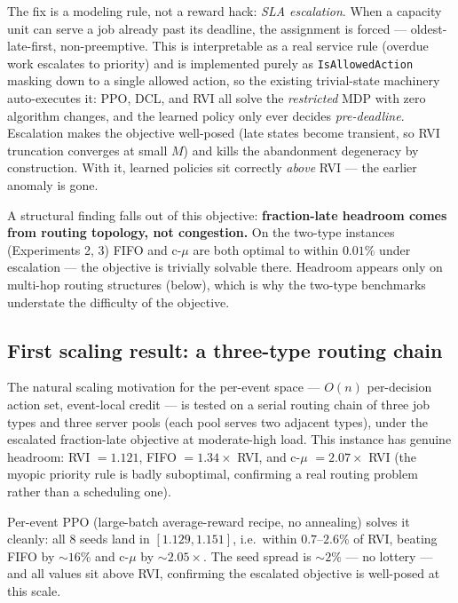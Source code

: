 \documentclass[11pt,a4paper]{article}
\begin{document}
The fix is a modeling rule, not a reward hack: \emph{SLA escalation}.
When a capacity unit can serve a job already past its deadline, the
assignment is forced --- oldest-late-first, non-preemptive.  This is
interpretable as a real service rule (overdue work escalates to priority)
and is implemented purely as \texttt{IsAllowedAction} masking down to a
single allowed action, so the existing trivial-state machinery
auto-executes it: PPO, DCL, and RVI all solve the \emph{restricted} MDP
with zero algorithm changes, and the learned policy only ever decides
\emph{pre-deadline}.  Escalation makes the objective well-posed (late
states become transient, so RVI truncation converges at small $M$) and
kills the abandonment degeneracy by construction.  With it, learned
policies sit correctly \emph{above} RVI --- the earlier anomaly is gone.

A structural finding falls out of this objective:
\textbf{fraction-late headroom comes from routing topology, not
congestion.}  On the two-type instances (Experiments 2, 3) FIFO and c-$\mu$
are both optimal to within $0.01\%$ under escalation --- the objective is
trivially solvable there.  Headroom appears only on multi-hop routing
structures (below), which is why the two-type benchmarks understate the
difficulty of the objective.

\subsection{First scaling result: a three-type routing chain}
\label{sec:pe-scaling}

The natural scaling motivation for the per-event space --- $O(n)$
per-decision action set, event-local credit --- is tested on a serial
routing chain of three job types and three server pools (each pool serves
two adjacent types), under the escalated fraction-late objective at
moderate-high load.  This instance has genuine headroom: RVI $=1.121$,
FIFO $=1.34\times$ RVI, and c-$\mu$ $=2.07\times$ RVI (the myopic priority
rule is badly suboptimal, confirming a real routing problem rather than a
scheduling one).

Per-event PPO (large-batch average-reward recipe, no annealing) solves it
cleanly: all 8 seeds land in $[1.129, 1.151]$, i.e.\ within
$0.7$--$2.6\%$ of RVI, beating FIFO by $\sim16\%$ and c-$\mu$ by
$\sim2.05\times$.  The seed spread is $\sim2\%$ --- no lottery --- and all
values sit above RVI, confirming the escalated objective is well-posed at
this scale.
\end{document}
